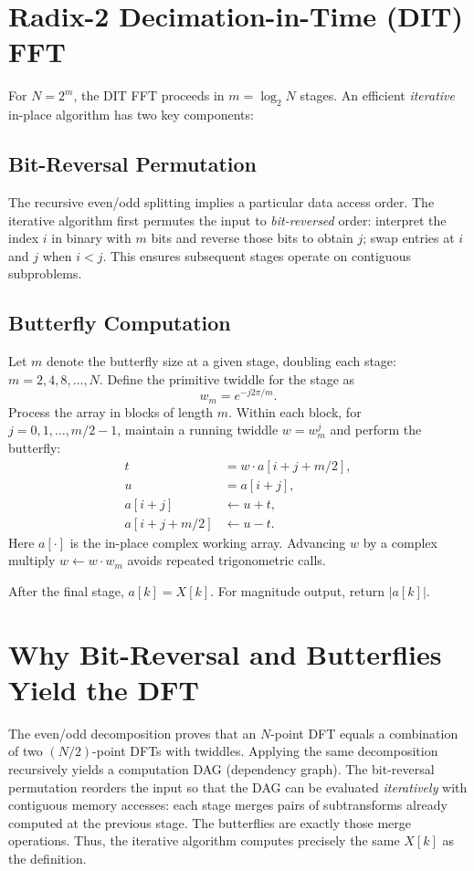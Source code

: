 \documentclass[11pt,a4paper]{article}
\begin{document}
\section{Radix-2 Decimation-in-Time (DIT) FFT}
For $N=2^m$, the DIT FFT proceeds in $m=\log_2 N$ stages. An efficient \emph{iterative} in-place algorithm has two key components:

\subsection{Bit-Reversal Permutation}
The recursive even/odd splitting implies a particular data access order. The iterative algorithm first permutes the input to \emph{bit-reversed} order: interpret the index $i$ in binary with $m$ bits and reverse those bits to obtain $j$; swap entries at $i$ and $j$ when $i<j$. This ensures subsequent stages operate on contiguous subproblems.

\subsection{Butterfly Computation}
Let $m$ denote the butterfly size at a given stage, doubling each stage: $m=2,4,8,\dots,N$. Define the primitive twiddle for the stage as
\begin{equation}
  w_m = e^{-j 2\pi/m}.
\end{equation}
Process the array in blocks of length $m$. Within each block, for $j=0,1,\dots, m/2-1$, maintain a running twiddle $w = w_m^j$ and perform the butterfly:
\begin{align}
  t &= w \cdot a[i + j + m/2], \\
  u &= a[i + j], \\
  a[i + j] &\leftarrow u + t, \\
  a[i + j + m/2] &\leftarrow u - t.
\end{align}
Here $a[\cdot]$ is the in-place complex working array. Advancing $w$ by a complex multiply $w \leftarrow w \cdot w_m$ avoids repeated trigonometric calls.

After the final stage, $a[k] = X[k]$. For magnitude output, return $|a[k]|$.

\section{Why Bit-Reversal and Butterflies Yield the DFT}
The even/odd decomposition proves that an $N$-point DFT equals a combination of two $(N/2)$-point DFTs with twiddles. Applying the same decomposition recursively yields a computation DAG (dependency graph). The bit-reversal permutation reorders the input so that the DAG can be evaluated \emph{iteratively} with contiguous memory accesses: each stage merges pairs of subtransforms already computed at the previous stage. The butterflies are exactly those merge operations. Thus, the iterative algorithm computes precisely the same $X[k]$ as the definition.
\end{document}
